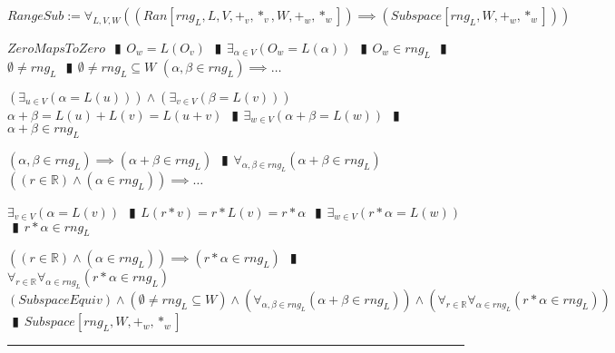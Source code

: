 \documentclass{book}
\newcommand{\abr}{:=}
\newcommand{\pipe}{$\phantom{(}\vrectangleblack\phantom{)}$}
\newcommand{\pr}[1]{\left(#1\right)}
\begin{document}
$RangeSub \abr \forall_{L, V, W}\pr{(Ran[rng_L, L, V, +_v, *_v, W, +_w, *_w]) \implies (Subspace[rng_L, W, +_w, *_w])}$
\begin{enumerate}
  \lit $ZeroMapsToZero$ \pipe $O_w = L(O_v)$ \pipe $\exists_{\alpha \in V}\pr{O_w = L(\alpha)}$ \pipe $O_w \in rng_L$ \pipe $\emptyset \neq rng_L$ \pipe $\emptyset \neq rng_L \subseteq W$
  \lit $(\alpha, \beta \in rng_L) \implies \ldots$
  \begin{enumerate}
    \lit $\pr{\exists_{u \in V}\pr{\alpha = L(u)}} \land \pr{\exists_{v \in V}\pr{\beta = L(v)}}$
    \lit $\alpha + \beta = L(u) + L(v) = L(u + v)$ \pipe $\exists_{w \in V}\pr{\alpha + \beta = L(w)}$ \pipe $\alpha + \beta \in rng_L$
  \end{enumerate}
  \lit $(\alpha, \beta \in rng_L) \implies (\alpha + \beta \in rng_L)$ \pipe $\forall_{\alpha, \beta \in rng_L}(\alpha + \beta \in rng_L)$
  \lit $\pr{(r \in \mathbb{R}) \land (\alpha \in rng_L)} \implies \ldots$
  \begin{enumerate}
    \lit $\exists_{v \in V}\pr{\alpha = L(v)}$ \pipe $L(r * v) = r * L(v) = r * \alpha$ \pipe $\exists_{w \in V}\pr{r * \alpha = L(w)}$ \pipe $r * \alpha \in rng_L$
  \end{enumerate}
  \lit $\pr{(r \in \mathbb{R}) \land (\alpha \in rng_L)} \implies (r * \alpha \in rng_L)$ \pipe $\forall_{r \in \mathbb{R}} \forall_{\alpha \in rng_L}(r * \alpha \in rng_L)$
  \lit $(SubspaceEquiv) \land (\emptyset \neq rng_L \subseteq W) \land \pr{\forall_{\alpha, \beta \in rng_L}(\alpha + \beta \in rng_L)} \land \pr{\forall_{r \in \mathbb{R}} \forall_{\alpha \in rng_L}(r * \alpha \in rng_L)}$ \pipe $Subspace[rng_L, W, +_w, *_w]$
\end{enumerate} \vspace{.75mm} \hrule \vspace{.75mm} \ \\ 
\end{document}
